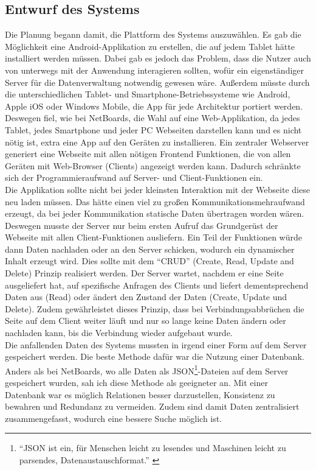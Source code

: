 \subsection{Entwurf des Systems}\label{Entwurf des Systems}
Die Planung begann damit, die Plattform des Systems auszuwählen.
Es gab die Möglichkeit eine Android-Applikation zu erstellen, die auf jedem Tablet hätte installiert werden müssen.
Dabei gab es jedoch das Problem, dass die Nutzer auch von unterwegs mit der Anwendung interagieren sollten, wofür ein eigenständiger Server für die Datenverwaltung notwendig gewesen wäre.
Außerdem müsste durch die unterschiedlichen Tablet- und Smartphone-Betriebssysteme wie Android, Apple iOS oder Windows Mobile, die App für jede Architektur portiert werden.
\\
Deswegen fiel, wie bei NetBoards, die Wahl auf eine Web-Applikation, da jedes Tablet, jedes Smartphone und jeder PC Webseiten darstellen kann und es nicht nötig ist, extra eine App auf den Geräten zu installieren.
Ein zentraler Webserver generiert eine Webseite mit allen nötigen Frontend Funktionen, die von allen Geräten mit Web-Browser (Clients) angezeigt werden kann.
Dadurch schränkte sich der Programmieraufwand auf Server- und Client-Funktionen ein.
\\
Die Applikation sollte nicht bei jeder kleinsten Interaktion mit der Webseite diese neu laden müssen. Das hätte einen viel zu großen Kommunikationsmehraufwand erzeugt, da bei jeder Kommunikation statische Daten übertragen worden wären.
Deswegen musste der Server nur beim ersten Aufruf das Grundgerüst der Webseite mit allen Client-Funktionen ausliefern. Ein Teil der Funktionen würde dann Daten nachladen oder an den Server schicken, wodurch ein dynamischer Inhalt erzeugt wird.
Dies sollte mit dem ``CRUD'' (Create, Read, Update and Delete) Prinzip realisiert werden.
Der Server wartet, nachdem er eine Seite ausgeliefert hat, auf spezifische Anfragen des Clients und liefert dementsprechend Daten aus (Read) oder ändert den Zustand der Daten (Create, Update und Delete). Zudem gewährleistet dieses Prinzip, dass bei Verbindungsabbrüchen die Seite auf dem Client weiter läuft und nur so lange keine Daten ändern oder nachladen kann, bis die Verbindung wieder aufgebaut wurde.
\\
Die anfallenden Daten des Systems mussten in irgend einer Form auf dem Server gespeichert werden. Die beste Methode dafür war die Nutzung einer Datenbank. Anders als bei NetBoards, wo alle Daten als JSON\footnote{``JSON ist ein, für Menschen leicht zu lesendes und Maschinen leicht zu parsendes, Datenaustauschformat.'' \cite{json:website}}-Dateien auf dem Server gespeichert wurden, sah ich diese Methode als geeigneter an. Mit einer Datenbank war es möglich Relationen besser darzustellen, Konsistenz zu bewahren und Redundanz zu vermeiden. Zudem sind damit Daten zentralisiert zusammengefasst, wodurch eine bessere Suche möglich ist.
